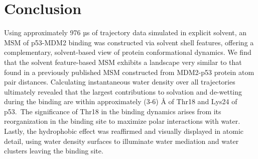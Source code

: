 
\section{Conclusion}

Using approximately 976 µs of trajectory data simulated in explicit
solvent, an MSM of p53-MDM2 binding was constructed via solvent shell
features, offering a complementary, solvent-based view of protein
conformational dynamics. We find that the solvent feature-based MSM
exhibits a landscape very similar to that found in a previously
published MSM constructed from MDM2-p53 protein atom pair distances.
Calculating instantaneous water density over all trajectories ultimately
revealed that the largest contributions to solvation and de-wetting
during the binding are within approximately (3-6) Å of Thr18 and
Lys24 of p53.~The significance of Thr18 in the binding dynamics arises
from its reorganization in the binding site to maximize polar
interactions with water.~ Lastly, the hydrophobic effect was reaffirmed
and visually displayed in atomic detail, using water density surfaces to
illuminate water mediation and water clusters leaving the binding site.

